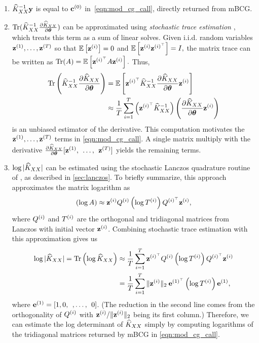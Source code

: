 \begin{enumerate}
  \item $\widehat{K}_{XX}^{-1}\mathbf{y}$ is equal to $\mathbf{c}^{(0)}$ in~\cref{eqn:mod_cg_call}, directly returned from mBCG.

  \item $\tr{ \trainK^{-1} \frac{\partial \trainK}{\partial \btheta} }$ can be approximated using \emph{stochastic trace estimation} \cite{hutchinson1990stochastic,fitzsimons2016improved}, which treats this term as a sum of linear solves.
    Given i.i.d. random variables $\mathbf{z}^{(1)}, \ldots, \mathbf{z}^{(T)}$ so that $\operatorname*{\mathbb{E}} \left[ \mathbf{z}^{(i)} \right]=0$ and $\operatorname*{\mathbb{E}} \left[ \mathbf{z}^{(i)} \mathbf{z}^{(i)^\top} \right]=I,
    $
    the matrix trace can be written as
    $
      \tr{\bA} = \Ev{\bz^{(i)^\top} \bA\bz^{(i)}}.
    $
    Thus,
    \begin{align}
      \tr{\trainK^{-1}\frac{\partial \trainK}{\partial \btheta}} &= \Ev{\bz^{(i)^\top} \trainK^{-1} \frac{\partial \trainK}{\partial \btheta} \bz^{(i)}}
      \nonumber \\
      &\approx \frac{1}{T}\sum_{i=1}^{T}\left(\bz^{(i)^\top} \trainK^{-1}\right)\left(\frac{\partial \trainK}{\partial \btheta}\bz^{(i)} \right)
      \label{eqn:trace_deriv_estimate}
    \end{align}
    is an unbiased estimator of the derivative.
    This computation motivates the $\mathbf{z}^{(1)}, \ldots, \mathbf{z}^{(T)}$ terms in \cref{eqn:mod_cg_call}.
    A single matrix multiply with the derivative $\frac{\partial \widehat{K}_{XX}}{\partial \boldsymbol{\theta}}[\mathbf{z}^{(1)}, \:\: \ldots, \:\: \mathbf{z}^{(T)}]$ yields the remaining terms.

  \item $\log \vert \widehat{K}_{XX} \vert$
    can be estimated using the stochastic Lanczos quadrature routine of \citet{ubaru2017fast}, as described in \cref{sec:lanczos}.
    To briefly summarize, this approach approximates the matrix logarithm as
    \[ \left( \log A \right) \approx \mathbf{z}^{(i)} Q^{(i)} \left( \log T^{(i)} \right) Q^{(i)^\top} \mathbf{z}^{(i)}, \]
    where $Q^{(i)}$ and $T^{(i)}$ are the orthogonal and tridiagonal matrices from Lanczos with initial vector $\mathbf{z}^{(i)}$.
    Combining stochastic trace estimation with this approximation gives us
    \begin{align*}
      \log \vert \trainK \vert = \tr{ \log \trainK }
      &\approx \frac{1}{T} \sum_{i=1}^T \bz^{(i)^\top} \bQ^{(i)} \left( \log \bT^{(i)} \right) \bQ^{(i)^\top} \bz^{(i)}
      \\
      &= \frac{1}{T} \sum_{i=1}^T \Vert \bz^{(i)} \Vert_2 \: \be^{(1)^\top} \left( \log \bT^{(i)} \right) \be^{(1)},
    \end{align*}
    where $\mathbf{e}^{(1)} = [1, 0, \:\:, \ldots, \:\: 0]$.
    (The reduction in the second line comes from the orthogonality of $Q^{(i)}$ with $\mathbf{z}^{(i)} / \Vert \mathbf{z}^{(i)} \Vert_2$ being its first column.)
    Therefore, we can estimate the log determinant of $\widehat{K}_{XX}$ simply by computing logarithms of the tridiagonal matrices returned by mBCG in \cref{eqn:mod_cg_call}.
\end{enumerate}
